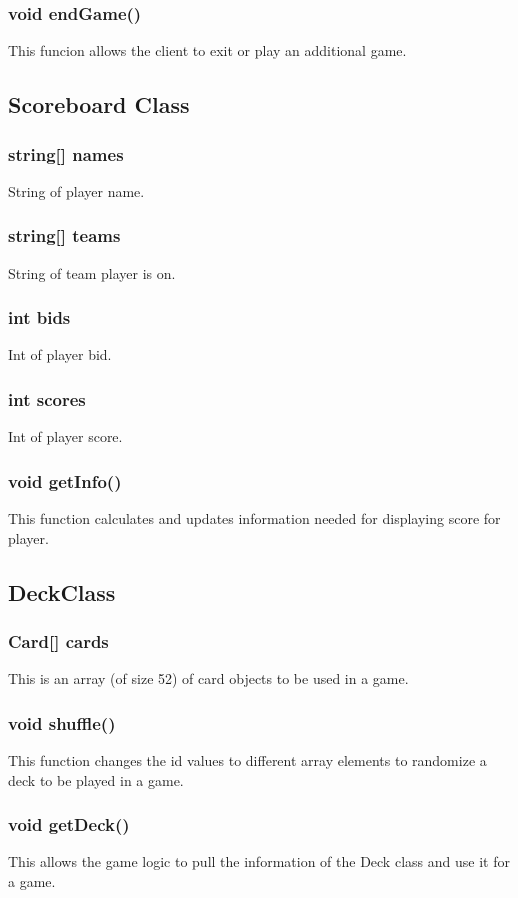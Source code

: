 \subsubsection{void endGame()}
	This funcion allows the client to exit or play an additional game.

\subsection{Scoreboard Class}

\subsubsection{string[] names}
	String of player name.
\subsubsection{string[] teams}
	String of team player is on.
\subsubsection{int bids}
	Int of player bid.
\subsubsection{int scores}
	Int of player score.
\subsubsection{void getInfo()}
	This function calculates and updates information needed for displaying score for player.

\subsection{DeckClass}

\subsubsection{Card[] cards}
	This is an array (of size 52) of card objects to be used in a game.
\subsubsection{void shuffle()}
	This function changes the id values to different array elements to randomize a deck to be played in a game.
\subsubsection{void getDeck()}
	This allows the game logic to pull the information of the Deck class and use it for a game.
